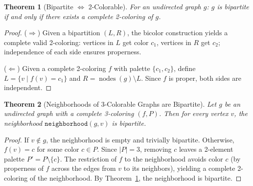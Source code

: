\documentclass[11pt]{article}
\theoremstyle{plain}
\newtheorem{theorem}{Theorem}[section]
\theoremstyle{definition}
\theoremstyle{remark}
\newcommand{\nodes}{\operatorname{nodes}}
\begin{document}
\begin{theorem}[Bipartite $\iff$ 2-Colorable]
\label{thm:bip-iff-2col}
For an undirected graph $g$: $g$ is bipartite if and only if there exists a complete 2-coloring of $g$.
\end{theorem}

\begin{proof}
($\Rightarrow$) Given a bipartition $(L, R)$, the bicolor construction yields a complete valid 2-coloring: vertices in $L$ get color $c_1$, vertices in $R$ get $c_2$; independence of each side ensures properness.

($\Leftarrow$) Given a complete 2-coloring $f$ with palette $\{c_1, c_2\}$, define $L = \{v \mid f(v) = c_1\}$ and $R = \nodes(g) \setminus L$. Since $f$ is proper, both sides are independent.
\end{proof}

\begin{theorem}[Neighborhoods of 3-Colorable Graphs are Bipartite]
\label{thm:nbd-bipartite}
Let $g$ be an undirected graph with a complete 3-coloring $(f, P)$. Then for every vertex $v$, the neighborhood $\texttt{neighborhood}(g, v)$ is bipartite.
\end{theorem}

\begin{proof}
If $v \notin g$, the neighborhood is empty and trivially bipartite. Otherwise, $f(v) = c$ for some color $c \in P$. Since $|P| = 3$, removing $c$ leaves a 2-element palette $P' = P \setminus \{c\}$. The restriction of $f$ to the neighborhood avoids color $c$ (by properness of $f$ across the edges from $v$ to its neighbors), yielding a complete 2-coloring of the neighborhood. By Theorem~\ref{thm:bip-iff-2col}, the neighborhood is bipartite.
\end{proof}
\end{document}
